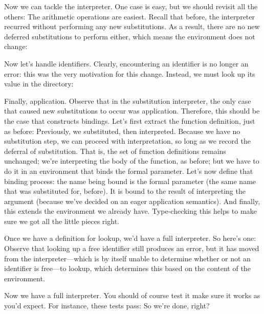 
Now we can tackle the interpreter. One case is easy, but we should revisit all
the others:
The arithmetic operations are easiest. Recall that before, the interpreter
recurred without performing any new substitutions. As a result, there are no new
deferred substitutions to perform either, which means the environment does not
change:

Now let’s handle identifiers. Clearly, encountering an identifier is no longer
an error: this was the very motivation for this change. Instead, we must look up
its value in the directory:


Finally, application. Observe that in the substitution interpreter, the only
case that caused new substitutions to occur was application. Therefore, this
should be the case that constructs bindings. Let’s first extract the function
definition, just as before:
Previously, we substituted, then interpreted. Because we have no substitution
step, we can proceed with interpretation, so long as we record the deferral of
substitution.
That is, the set of function definitions remains unchanged; we’re interpreting
the body of the function, as before; but we have to do it in an environment that
binds the formal parameter. Let’s now define that binding process:
the name being bound is the formal parameter (the same name that was substituted
for, before). It is bound to the result of interpreting the argument (because
we’ve decided on an eager application semantics). And finally, this extends the
environment we already have. Type-checking this helps to make sure we got all
the little pieces right.

Once we have a definition for lookup, we’d have a full interpreter. So here’s
one:
Observe that looking up a free identifier still produces an error, but it has
moved from the interpreter—which is by itself unable to determine whether or not
an identifier is free—to lookup, which determines this based on the content of
the environment.

Now we have a full interpreter. You should of course test it make sure it works
as you’d expect. For instance, these tests pass:
So we’re done, right?

